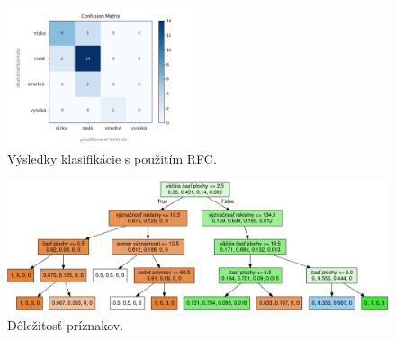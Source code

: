 \begin{figure}[ht]
    \centering
    \includegraphics[width=0.5\textwidth]{images/05/v3.png}
    \caption{Výsledky klasifikácie s použitím RFC.}
    \label{img:matrix}
\end{figure}


\begin{figure}[ht]
    \centering
    \includegraphics[width=1\textwidth]{images/05/tree.png}
    \caption{Dôležitosť príznakov.}
    \label{img:tree}
\end{figure}